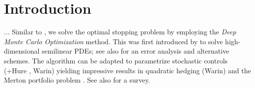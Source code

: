 \section{Introduction}
... 
Similar to \cite{Becker1,Becker2}, we solve the optimal stopping problem by employing the \textit{Deep Monte Carlo Optimization} method. This was  first introduced by \citet{HanJentzenE} to solve high-dimensional semilinear PDEs; see also \cite{Germain} for an error analysis and alternative schemes. The algorithm can be adapted to parametrize  stochastic controls \cite{HanE} (+Hure , Warin) yielding impressive results  in quadratic hedging  (Warin) and the  Merton portfolio problem  \cite{ReppenSoner}. See also \cite{ReppenSonerTissot} for a survey.     %
 
